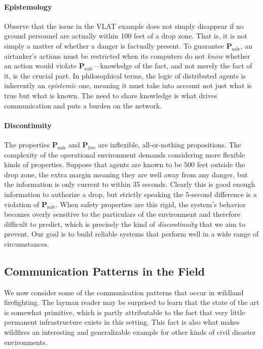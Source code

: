 \documentclass[]             %
{NASA}                       %
\theoremstyle{definition}
\begin{document}
\paragraph{Epistemology}
Observe that the issue in the VLAT example does not simply disappear
if no ground personnel are actually within 100 feet of a drop
zone. That is, it is not simply a matter of whether a danger is
factually present. To guarantee \(\textbf{P}_\textrm{safe}\), an
airtanker's actions must be restricted when its computers do not
\emph{know} whether an action would violate
\(\textbf{P}_\textrm{safe}\)---knowledge of the fact, and not merely
the fact of it, is the crucial part. In philosophical terms, the logic
of distributed agents is inherently an \emph{epistemic} one, meaning
it must take into account not just what is true but what is known. The
need to share knowledge is what drives communication and puts a burden
on the network.

\paragraph{Discontinuity}
The properties $\mathbf{P}_\textrm{safe}$ and
$\mathbf{P}_\textrm{live}$ are inflexible, all-or-nothing
propositions. The complexity of the operational environment demands
considering more flexible kinds of properties. Suppose that agents are
known to be $500$ feet outside the drop zone, the extra margin meaning
they are well away from any danger, but the information is only
current to within 35 seconds. Clearly this is good enough information
to authorize a drop, but strictly speaking the 5-second difference is
a violation of $\mathbf{P}_\textrm{safe}$. When safety properties are
this rigid, the system's behavior becomes overly sensitive to the
particulars of the environment and therefore difficult to predict,
which is precisely the kind of \emph{discontinuity} that we aim to
prevent. Our goal is to build reliable systems that perform well in a
wide range of circumstances.

\subsection{Communication Patterns in the Field}
\label{communication-in-practice}

We now consider some of the communication patterns that occur in
wildland firefighting. The layman reader may be surprised to learn
that the state of the art is somewhat primitive, which is partly
attributable to the fact that very little permanent infrastructure
exists in this setting. This fact is also what makes wildfires an
interesting and generalizable example for other kinds of civil
disaster environments.
\end{document}
